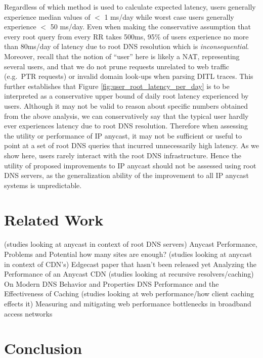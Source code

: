 \documentclass[sigconf,nonacm,10pt]{acmart}
\begin{document}
Regardless of which method is used to calculate expected latency, users
generally experience median values of \(<\) 1 ms/day while worst case
users generally experience \(<\) 50 ms/day. Even when making the
conservative assumption that every root query from every RR takes 500ms,
95\% of users experience no more than 80ms/day of latency due to root
DNS resolution which is \textit{inconsequential}. Moreover, recall that
the notion of ``user'' here is likely a NAT, representing several users,
and that we do not prune requests unrelated to web traffic (e.g.~PTR
requests) or invalid domain look-ups when parsing DITL traces. This
further establishes that Figure \ref{fig:user_root_latency_per_day} is
to be interpreted as a conservative upper bound of daily root latency
experienced by users. Although it may not be valid to reason about
specific numbers obtained from the above analysis, we can conservatively
say that the typical user hardly ever experiences latency due to root
DNS resolution. Therefore when assessing the utility or performance of
IP anycast, it may not be sufficient or useful to point at a set of root
DNS queries that incurred unnecessarily high latency. As we show here,
users rarely interact with the root DNS infrastructure. Hence the
utility of proposed improvements to IP anycast should not be assessed
using root DNS servers, as the generalization ability of the improvement
to all IP anycast systems is unpredictable.

\section{Related Work}\label{related-work-1}

(studies looking at anycast in context of root DNS servers) Anycast
Performance, Problems and Potential how many sites are enough? (studies
looking at anycast in context of CDN's) Edgecast paper that hasn't been
released yet Analyzing the Performance of an Anycast CDN (studies
looking at recursive resolvers/caching) On Modern DNS Behavior and
Properties DNS Performance and the Effectiveness of Caching (studies
looking at web performance/how client caching effects it) Measuring and
mitigating web performance bottlenecks in broadband access networks

\section{Conclusion}\label{conclusion-1}
\end{document}
